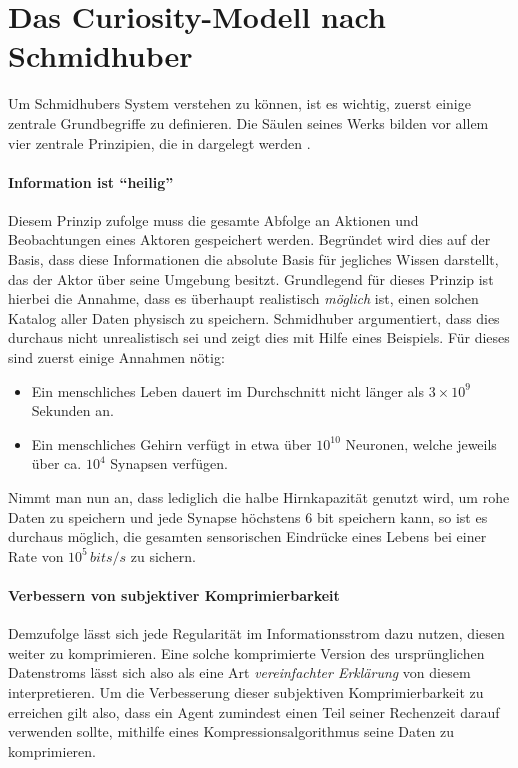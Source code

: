 
\section{Das Curiosity-Modell nach Schmidhuber}
\label{sec:Curiosity_Schmidhuber}
Um Schmidhubers System verstehen zu können, ist es wichtig, zuerst einige zentrale Grundbegriffe zu definieren.
Die Säulen seines Werks bilden vor allem vier zentrale Prinzipien, die in  dargelegt werden \cite{curiosity_schmidhuber}.


\paragraph{Information ist ``heilig''}
\label{sec:Information_Heilig}
Diesem Prinzip zufolge muss die gesamte Abfolge an Aktionen und Beobachtungen eines Aktoren gespeichert werden. Begründet wird dies auf der Basis, dass diese Informationen die absolute Basis für jegliches Wissen darstellt, das der Aktor über seine Umgebung besitzt. 
Grundlegend für dieses Prinzip ist hierbei die Annahme, dass es überhaupt realistisch \emph{möglich} ist, einen solchen Katalog aller Daten physisch zu speichern.
Schmidhuber argumentiert, dass dies durchaus nicht unrealistisch sei und zeigt dies mit Hilfe eines Beispiels. 
Für dieses sind zuerst einige Annahmen nötig: 
\begin{itemize}
    \item Ein menschliches Leben dauert im Durchschnitt nicht länger als \(3\times10^9\) Sekunden an.
    \item Ein menschliches Gehirn verfügt in etwa über \(10^{10}\) Neuronen, welche jeweils über ca. \(10^{4}\) Synapsen verfügen.
\end{itemize}
Nimmt man nun an, dass lediglich die halbe Hirnkapazität genutzt wird, um rohe Daten zu speichern und jede Synapse höchstens 6 bit speichern kann, so ist es durchaus möglich, die gesamten sensorischen Eindrücke eines Lebens bei einer Rate von \(10^5\, \textit{bits/s}\) zu sichern.

\paragraph{Verbessern von subjektiver Komprimierbarkeit}
\label{sec:Komprimierbarkeit_verbessern}
Demzufolge lässt sich jede Regularität im Informationsstrom dazu nutzen, diesen weiter zu komprimieren. Eine solche komprimierte Version des ursprünglichen Datenstroms lässt sich also als eine Art \emph{vereinfachter Erklärung} von diesem interpretieren. Um die Verbesserung dieser subjektiven Komprimierbarkeit zu erreichen gilt also, dass ein Agent zumindest einen Teil seiner Rechenzeit darauf verwenden sollte, mithilfe eines Kompressionsalgorithmus seine Daten zu komprimieren.

